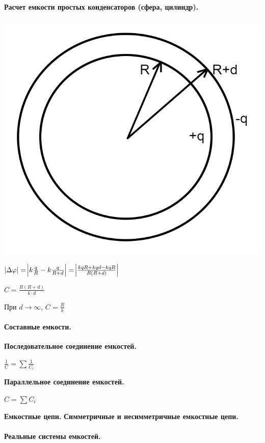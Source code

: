 \documentclass{article}
\begin{document}
            \paragraph{Расчет емкости простых конденсаторов (сфера, цилиндр).}
                \includegraphics[scale=0.2]{1_1_15_4-1.png}

                \(\abs{\Delta \varphi} = \abs{k\frac{q}{R} - k\frac{q}{R+d}} = \abs{\frac{kqR+kqd-kqR}{R(R+d)}}\)

                \(C = \frac{R(R+d)}{k\cdot d}\)

                При \(d\to\infty\), \(C = \frac{R}{k}\)
            \paragraph{Составные емкости.}
                \textbf{Последовательное соединение емкостей.}
                    
                \(\frac{1}{C} = \sum{\frac{1}{C_i}}\)

                \textbf{Параллельное соединение емкостей.}
                
                \(C = \sum{C_i}\)

                \textbf{Емкостные цепи.}
                \textbf{Симметричные и несимметричные емкостные цепи.}
            \paragraph{Реальные системы емкостей.}
\end{document}
